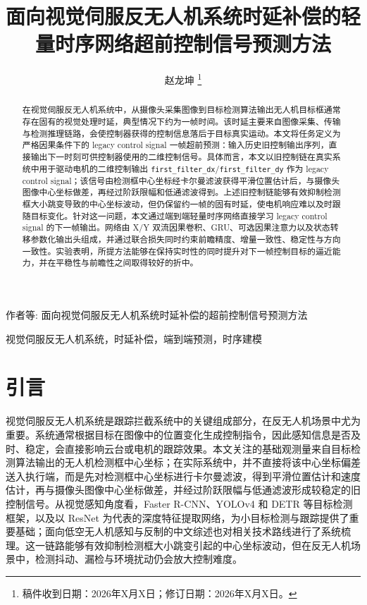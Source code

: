 \documentclass[journal]{IEEEtran}
\begin{document}
\title{面向视觉伺服反无人机系统时延补偿的轻量时序网络超前控制信号预测方法}

\author{赵龙坤%
\thanks{稿件收到日期：2026年X月X日；修订日期：2026年X月X日。}}

%
{作者等: 面向视觉伺服反无人机系统时延补偿的超前控制信号预测方法}

\maketitle

\begin{abstract}
在视觉伺服反无人机系统中，从摄像头采集图像到目标检测算法输出无人机目标框通常存在固有的视觉处理时延，典型情况下约为一帧时间。该时延主要来自图像采集、传输与检测推理链路，会使控制器获得的控制信息落后于目标真实运动。本文将任务定义为严格因果条件下的 legacy control signal 一帧超前预测：输入历史旧控制输出序列，直接输出下一时刻可供控制器使用的二维控制信号。具体而言，本文以旧控制链在真实系统中用于驱动电机的二维控制输出 \texttt{first\_filter\_dx}/\texttt{first\_filter\_dy} 作为 legacy control signal；该信号由检测框中心坐标经卡尔曼滤波获得平滑位置估计后，与摄像头图像中心坐标做差，再经过阶跃限幅和低通滤波得到。上述旧控制链能够有效抑制检测框大小跳变导致的中心坐标波动，但仍保留约一帧的固有时延，使电机响应难以及时跟随目标变化。针对这一问题，本文通过端到端轻量时序网络直接学习 legacy control signal 的下一帧输出。网络由 X/Y 双流因果卷积、GRU、可选因果注意力以及状态转移参数化输出头组成，并通过联合损失同时约束前瞻精度、增量一致性、稳定性与方向一致性。实验表明，所提方法能够在保持实时性的同时提升对下一帧控制目标的逼近能力，并在平稳性与前瞻性之间取得较好的折中。
\end{abstract}

\begin{IEEEkeywords}
视觉伺服反无人机系统，时延补偿，端到端预测，时序建模
\end{IEEEkeywords}

\section{引言}
视觉伺服反无人机系统是跟踪拦截系统中的关键组成部分，在反无人机场景中尤为重要\cite{chaumette2006visual,hutchinson1996tutorial,corke2011robotics}。系统通常根据目标在图像中的位置变化生成控制指令，因此感知信息是否及时、稳定，会直接影响云台或电机的跟踪效果。本文关注的基础观测量来自目标检测算法输出的无人机检测框中心坐标；在实际系统中，并不直接将该中心坐标偏差送入执行端，而是先对检测框中心坐标进行卡尔曼滤波，得到平滑位置估计和速度估计，再与摄像头图像中心坐标做差，并经过阶跃限幅与低通滤波形成较稳定的旧控制信号\cite{yilmaz2006object,redmon2016you}。从视觉感知角度看，Faster R-CNN、YOLOv4 和 DETR 等目标检测框架，以及以 ResNet 为代表的深度特征提取网络，为小目标检测与跟踪提供了重要基础\cite{he2016deep,ren2015faster,bochkovskiy2020yolov4,carion2020detr}；面向低空无人机感知与反制的中文综述也对相关技术路线进行了系统梳理\cite{cao2022survey_cn,leng2023droneview_cn}。这一链路能够有效抑制检测框大小跳变引起的中心坐标波动，但在反无人机场景中\cite{shi2021anti}，检测抖动、漏检与环境扰动仍会放大控制难度。
\end{document}
